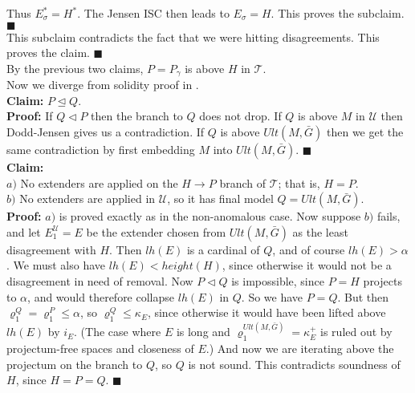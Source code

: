 \documentclass[12pt]{article}
\begin{document}
Thus $E_\sigma^* = H^*$.  The Jensen ISC then leads to $E_\sigma = H$.  This proves the subclaim. $\blacksquare$\\

This subclaim contradicts the fact that we were hitting disagreements.  This proves the claim. $\blacksquare$\\

By the previous two claims, $P = P_\gamma$ is above $H$ in $\mathscr{T}$.\\

Now we diverge from solidity proof in \cite{FSPIPM}.\\


\textbf{Claim:}  $P \unlhd Q$.\\

\textbf{Proof:}  If $Q \lhd P$ then the branch to $Q$ does not drop.  If $Q$ is above $M$ in $\mathscr{U}$ then Dodd-Jensen gives us a contradiction.  If $Q$ is above $Ult(M, \bar{G})$ then we get the same contradiction by first embedding $M$ into $Ult(M, \bar{G})$. $\blacksquare$\\



\textbf{Claim:}\\

\indent \indent $a)$ No extenders are applied on the $H \longrightarrow P$ branch of $\mathscr{T}$; that is, $H = P$.\\

\indent \indent $b)$ No extenders are applied in $\mathscr{U}$, so it has final model $Q = Ult(M , \bar{G})$.\\

\indent \indent \textbf{Proof:} $a)$ is proved exactly as in the non-anomalous case.  Now suppose $b)$ fails, and let $E_1^{\mathscr{U}} = E$ be the extender chosen from $Ult( M, \bar{G})$ as the least disagreement with $H$.  Then $lh(E)$ is a cardinal of $Q$, and of course $lh(E) > \alpha$.  We must also have $lh(E) < height(H)$, since otherwise it would not be a disagreement in need of removal.  Now $P \lhd Q$ is impossible, since $P = H$ projects to $\alpha$, and would therefore collapse $lh(E)$ in $Q$.  So we have $P = Q$.  But then $\varrho_1^Q = \varrho_1^P \leq \alpha$, so $\varrho_1^Q \leq \kappa_E$, since otherwise it would have been lifted above $lh(E)$ by $i_E$.  (The case where $E$ is long and $\varrho_1^{Ult(M, \bar{G})} = \kappa_E^+$ is ruled out by projectum-free spaces and closeness of $E$.)  And now we are iterating above the projectum on the branch to $Q$, so $Q$ is not sound.  This contradicts soundness of $H$, since $H = P = Q$. $\blacksquare$\\
\end{document}
